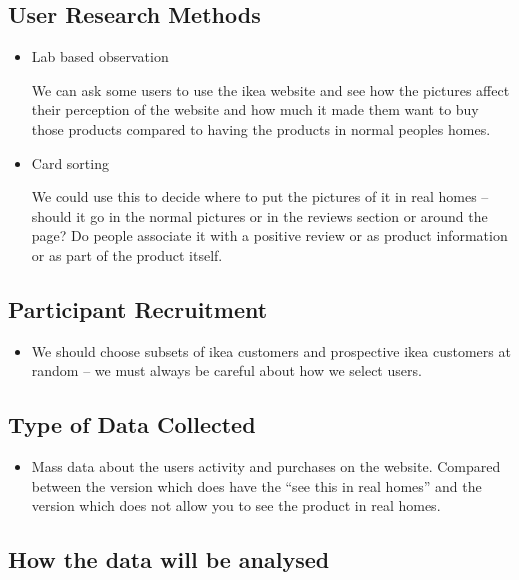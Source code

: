 \documentclass[10pt,\jkfside,a4paper]{article}
\begin{document}
\subsection*{User Research Methods}

\begin{itemize}

\item Lab based observation

We can ask some users to use the ikea website and see how the pictures affect their
perception of the website and how much it made them want to buy those products compared
to having the products in normal peoples homes.

\item Card sorting

We could use this to decide where to put the pictures of it in real homes --
should it go in the normal pictures or in the reviews section or around the page?
Do people associate it with a positive review or as product information or as part
of the product itself.

\end{itemize}

\subsection*{Participant Recruitment}

\begin{itemize}

\item We should choose subsets of ikea customers and prospective ikea customers
at random -- we must always be careful about how we select users.

\end{itemize}

\subsection*{Type of Data Collected}

\begin{itemize}

\item Mass data about the users activity and purchases on the website.
Compared between the version which does have the ``see this in real homes''
and the version which does not allow you to see the product in real homes.

\end{itemize}

\subsection*{How the data will be analysed}
\end{document}
